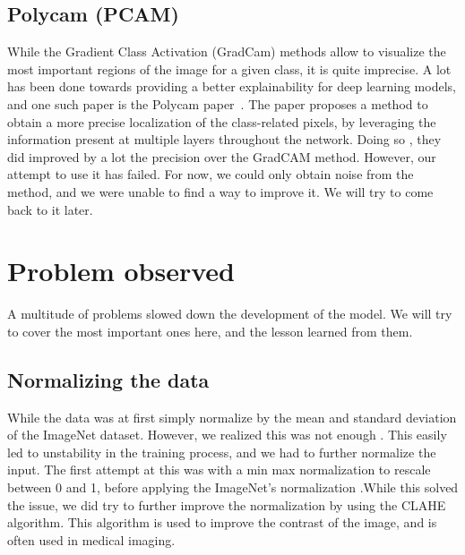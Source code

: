 \documentclass[11pt]{article}
\begin{document}
    \subsection{Polycam (PCAM)}

    While the Gradient Class Activation (GradCam) methods allow to visualize the most important regions of the image for a given class, it is quite imprecise. A lot has been done towards
    providing a better explainability for deep learning models, and one such paper is the Polycam paper~\cite{polycam}. The paper proposes a method to obtain a more precise localization of the
    class-related pixels, by leveraging the information present at multiple layers throughout the network. Doing so , they did improved by a lot the precision
    over the GradCAM method. However, our attempt to use it has failed. For now, we could only obtain noise from the method, and we were unable to find a way to improve it. We will try to
    come back to it later.



    \section{Problem observed}

    A multitude of problems slowed down the development of the model. We will try to cover the most
    important ones here, and the lesson learned from them.


    \subsection{Normalizing the data}

        While the data was at first simply normalize by the mean and standard deviation of the ImageNet dataset.
        However, we realized this was not enough . This easily led to unstability in the training process, and we had to further
        normalize the input. The first attempt at this was with a min max normalization to rescale between 0 and 1, before applying the ImageNet's normalization
        .While this solved the issue, we did try to further improve the normalization by using the CLAHE algorithm. This algorithm is used to improve the contrast of the image, and is often used in medical imaging.
\end{document}
